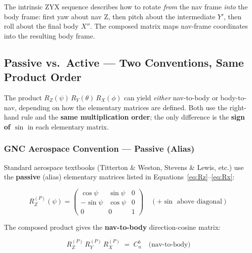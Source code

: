 \documentclass[12pt,a4paper]{article}
\begin{document}
\begin{keybox}
The intrinsic ZYX sequence describes how to rotate \emph{from} the nav frame
\emph{into} the body frame: first yaw about nav Z, then pitch about the
intermediate $Y'$, then roll about the final body $X''$. The composed matrix
maps nav-frame coordinates into the resulting body frame.
\end{keybox}

\subsection{Passive vs.\ Active --- Two Conventions, Same Product Order}

The product $R_Z(\psi)\,R_Y(\theta)\,R_X(\phi)$ can yield \emph{either}
nav-to-body or body-to-nav, depending on how the elementary matrices are
defined. Both use the right-hand rule and the \textbf{same multiplication
order}; the only difference is the \textbf{sign of $\sin$} in each
elementary matrix.

\subsubsection*{GNC Aerospace Convention --- Passive (Alias)}

Standard aerospace textbooks (Titterton \& Weston, Stevens \& Lewis, etc.)
use the \textbf{passive} (alias) elementary matrices listed in
Equations~\eqref{eq:Rz}--\eqref{eq:Rx}:

\begin{equation}
  R_Z^{(P)}(\psi) = \begin{pmatrix}
    \cos\psi  & \sin\psi  & 0 \\
    -\sin\psi & \cos\psi  & 0 \\
    0          & 0          & 1
  \end{pmatrix}
  \quad (+\sin\text{ above diagonal})
  \label{eq:RzP}
\end{equation}

The composed product gives the \textbf{nav-to-body} direction-cosine matrix:

\begin{equation}
\boxed{
  R_Z^{(P)}\, R_Y^{(P)}\, R_X^{(P)}
  \;=\; C_n^b
  \quad\text{(nav-to-body)}
}
\end{equation}
\end{document}
